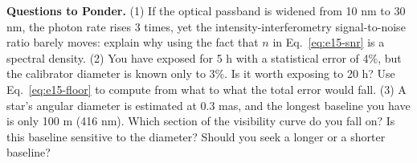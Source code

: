 \medskip
\noindent\textbf{Questions to Ponder.}
(1) If the optical passband is widened from 10 nm to 30 nm, the photon rate rises 3 times, yet the intensity-interferometry signal-to-noise ratio barely moves: explain why using the fact that $n$ in Eq.~\eqref{eq:e15-snr} is a spectral density.
(2) You have exposed for 5 h with a statistical error of 4\%, but the calibrator diameter is known only to 3\%. Is it worth exposing to 20 h? Use Eq.~\eqref{eq:e15-floor} to compute from what to what the total error would fall.
(3) A star's angular diameter is estimated at 0.3 mas, and the longest baseline you have is only 100 m (416 nm). Which section of the visibility curve do you fall on? Is this baseline sensitive to the diameter? Should you seek a longer or a shorter baseline?
